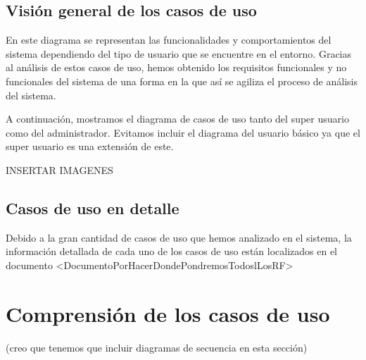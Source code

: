 \subsection{Visi\'on general de los casos de uso}
En este diagrama se representan las funcionalidades y comportamientos del sistema dependiendo del tipo de usuario que se encuentre en el entorno. Gracias al an\'alisis de estos casos de uso, hemos obtenido los requisitos funcionales y no funcionales del sistema de una forma en la que as\'i se agiliza el proceso de an\'alisis del sistema.
 
A continuaci\'on, mostramos el diagrama de casos de uso tanto del super usuario como del administrador. Evitamos incluir el diagrama del usuario b\'asico ya que el super usuario es una extensi\'on de este.

INSERTAR IMAGENES


\subsection{Casos de uso en detalle}
Debido a la gran cantidad de casos de uso que hemos analizado en el sistema, la informaci\'on detallada de cada uno de los casos de uso est\'an localizados en el documento <DocumentoPorHacerDondePondremosTodoslLosRF>
\section{Comprensi\'on de los casos de uso}
(creo que tenemos que incluir diagramas de secuencia en esta secci\'on)